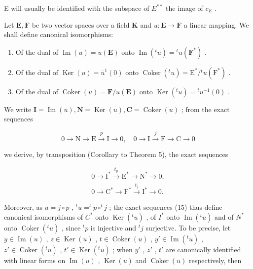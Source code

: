 E will usually be identified with the subspace of \(E^{**}\) the image of \(c_{E}\) .

Let \(\mathbf{E}, \mathbf{F}\) be two vector spaces over a field \(\mathbf{K}\) and \(u: \mathbf{E} \to \mathbf{F}\) a linear mapping. We shall define canonical isomorphisms:

\begin{enumerate}
\def\labelenumi{(\arabic{enumi})}
\item
  Of the dual of \(\operatorname{Im}(u) = u(\mathbf{E})\) onto \(\operatorname{Im}(^t u) = {}^t u(\mathbf{F}^*)\) .
\item
  Of the dual of \(\operatorname{Ker}(u) = \overline{u}^1(0)\) onto \(\operatorname{Coker}(^t u) = \mathrm{E}^* / {}^t u(\mathrm{F}^*)\) .
\item
  Of the dual of \(\operatorname{Coker}(u) = \mathbf{F} / u(\mathbf{E})\) onto \(\operatorname{Ker}(^t u) = {}^t u^{-1}(0)\) .
\end{enumerate}

We write \(\mathbf{I} = \operatorname{Im}(u),\mathbf{N} = \operatorname{Ker}(u),\mathbf{C} = \operatorname{Coker}(u)\) ; from the exact sequences

\[
0 \longrightarrow \mathrm{N} \longrightarrow \mathrm{E} \stackrel {p} {\longrightarrow} \mathrm{I} \longrightarrow 0, \quad 0 \longrightarrow \mathrm{I} \stackrel {j} {\longrightarrow} \mathrm{F} \longrightarrow \mathrm{C} \longrightarrow 0 \tag {14}
\]

we derive, by transposition (Corollary to Theorem 5), the exact sequences

\[
\begin{array}{l} 0 \longrightarrow \mathrm{I} ^ {*} \stackrel {{t _ {p}}} {{\longrightarrow}} \mathrm{E} ^ {*} \longrightarrow \mathrm{N} ^ {*} \longrightarrow 0, \\ 0 \longrightarrow \mathrm{C} ^ {*} \longrightarrow \mathrm{F} ^ {*} \stackrel {{t _ {j}}} {{\longrightarrow}} \mathrm{I} ^ {*} \longrightarrow 0. \end{array}\tag{15}
\]

Moreover, as \(u = j \circ p\) , \(^{t}u = ^{t}p \circ ^{t}j\) ; the exact sequences (15) thus define canonical isomorphisms of \(C^*\) onto \(\operatorname{Ker}(^{t}u)\) , of \(I^*\) onto \(\operatorname{Im}(^{t}u)\) and of \(N^*\) onto \(\operatorname{Coker}(^{t}u)\) , since \(^{t}p\) is injective and \(^{t}j\) surjective. To be precise, let \(y \in \operatorname{Im}(u)\) , \(z \in \operatorname{Ker}(u)\) , \(t \in \operatorname{Coker}(u)\) , \(y' \in \operatorname{Im}(^{t}u)\) , \(z' \in \operatorname{Coker}(^{t}u)\) , \(t' \in \operatorname{Ker}(^{t}u)\) ; when \(y'\) , \(z'\) , \(t'\) are canonically identified with linear forms on \(\operatorname{Im}(u)\) , \(\operatorname{Ker}(u)\) and \(\operatorname{Coker}(u)\) respectively, then


